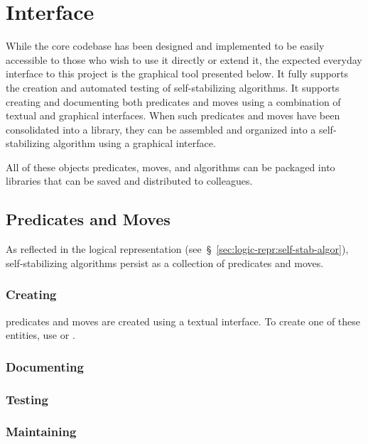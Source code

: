 \section{Interface}
\label{sec:interface-ssa}

While the core codebase has been designed and implemented
  to be easily accessible to those who wish to use it directly or extend it,
  the expected everyday interface to this project is
  the graphical tool presented below.
It fully supports the creation and automated testing of self-stabilizing algorithms.
It supports creating and documenting both predicates and moves
  using a combination of textual and graphical interfaces.
When such predicates and moves have been consolidated into a library,
  they can be assembled and organized into a self-stabilizing algorithm
  using a graphical interface.

All of these objects \Dash
  predicates, moves, and algorithms \Dash
  can be packaged into libraries that can be
  saved and distributed to colleagues.

\subsection{Predicates and Moves}
As reflected in the logical representation
  (see~\S~\ref{sec:logic-repr:self-stab-algor}),
  self-stabilizing algorithms persist as a collection
  of \glspl{predicate} and \glspl{move}.

\subsubsection{Creating}
\Glspl{predicate} and \glspl{move} are created using a textual interface.
To create one of these entities,
  use 
   or .
\subsubsection{Documenting}
\subsubsection{Testing}
\subsubsection{Maintaining}
